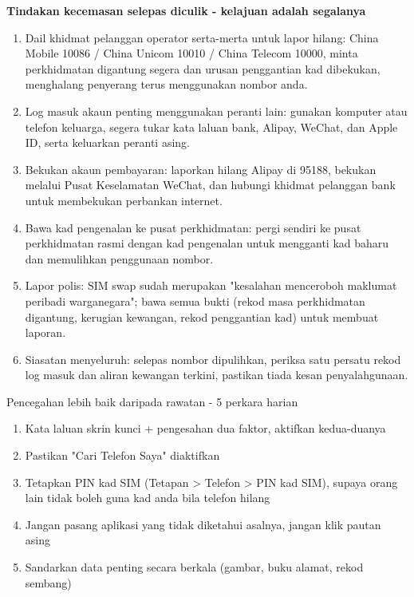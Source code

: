 \textbf{Tindakan kecemasan selepas diculik - kelajuan adalah segalanya}\par

\begin{enumerate}
  \item Dail khidmat pelanggan operator serta-merta untuk lapor hilang: China Mobile 10086 / China Unicom 10010 / China Telecom 10000, minta perkhidmatan digantung segera dan urusan penggantian kad dibekukan, menghalang penyerang terus menggunakan nombor anda.
  \item Log masuk akaun penting menggunakan peranti lain: gunakan komputer atau telefon keluarga, segera tukar kata laluan bank, Alipay, WeChat, dan Apple ID, serta keluarkan peranti asing.
  \item Bekukan akaun pembayaran: laporkan hilang Alipay di 95188, bekukan melalui Pusat Keselamatan WeChat, dan hubungi khidmat pelanggan bank untuk membekukan perbankan internet.
  \item Bawa kad pengenalan ke pusat perkhidmatan: pergi sendiri ke pusat perkhidmatan rasmi dengan kad pengenalan untuk mengganti kad baharu dan memulihkan penggunaan nombor.
  \item Lapor polis: SIM swap sudah merupakan "kesalahan menceroboh maklumat peribadi warganegara"; bawa semua bukti (rekod masa perkhidmatan digantung, kerugian kewangan, rekod penggantian kad) untuk membuat laporan.
  \item Siasatan menyeluruh: selepas nombor dipulihkan, periksa satu persatu rekod log masuk dan aliran kewangan terkini, pastikan tiada kesan penyalahgunaan.
\end{enumerate}

\begin{tcbwarn}{Pencegahan lebih baik daripada rawatan - 5 perkara harian}
\begin{enumerate}
  \item Kata laluan skrin kunci + pengesahan dua faktor, aktifkan kedua-duanya
  \item Pastikan "Cari Telefon Saya" diaktifkan
  \item Tetapkan PIN kad SIM (Tetapan > Telefon > PIN kad SIM), supaya orang lain tidak boleh guna kad anda bila telefon hilang
  \item Jangan pasang aplikasi yang tidak diketahui asalnya, jangan klik pautan asing
  \item Sandarkan data penting secara berkala (gambar, buku alamat, rekod sembang)
\end{enumerate}

\end{tcbwarn}

